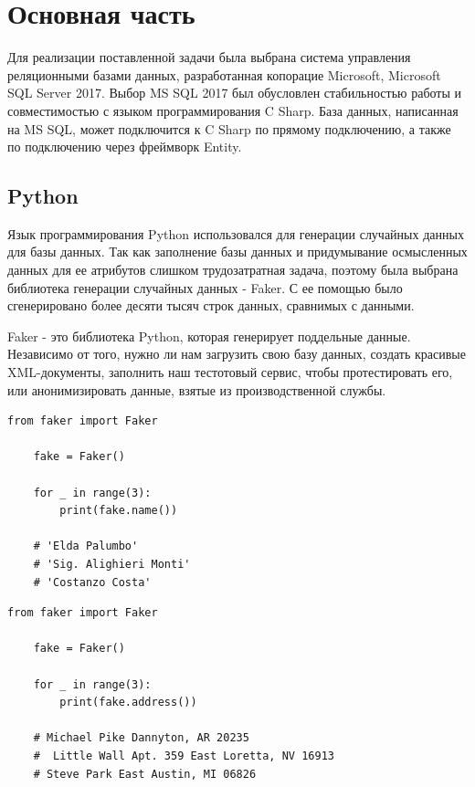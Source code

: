 \newpage
\section{Основная часть}

\vspace{0.5cm}
\hspace{0.6cm}
Для реализации поставленной задачи была выбрана система управления реляционными базами данных, разработанная копорацие Microsoft, Microsoft SQL Server 2017. Выбор MS SQL 2017 был обусловлен стабильностью работы и совместимостью с языком программирования C Sharp. База данных, написанная на MS SQL, может подключится к C Sharp по прямому подключению, а также по подключению через   фреймворк Entity.



\subsection{Python}

\vspace{0.5cm}
\hspace{0.6cm}
Язык программирования Python использовался для генерации случайных данных для базы данных. Так как заполнение базы данных и придумывание осмысленных данных для ее атрибутов слишком трудозатратная задача, поэтому была выбрана библиотека генерации случайных данных - Faker. С ее помощью было сгенерировано более десяти тысяч строк данных, сравнимых с данными.

\vspace{0.1cm}
Faker - это библиотека Python, которая генерирует поддельные данные. Независимо от того, нужно ли нам загрузить свою базу данных, создать красивые XML-документы, заполнить наш тестотовый сервис, чтобы протестировать его, или анонимизировать данные, взятые из производственной службы.

\begin{lstlisting}[caption=Создание фейковых имен, label = list:pythonFakerName]
	from faker import Faker
	
	fake = Faker()
	
	for _ in range(3):
		print(fake.name())
	
	# 'Elda Palumbo'
	# 'Sig. Alighieri Monti'
	# 'Costanzo Costa'

\end{lstlisting}

\begin{lstlisting}[caption=Генерация фейковых адресов, label = list:pythonFakerAddresses]
	from faker import Faker

	fake = Faker()

	for _ in range(3):
		print(fake.address())

	# Michael Pike Dannyton, AR 20235
	#  Little Wall Apt. 359 East Loretta, NV 16913
	# Steve Park East Austin, MI 06826

\end{lstlisting}

